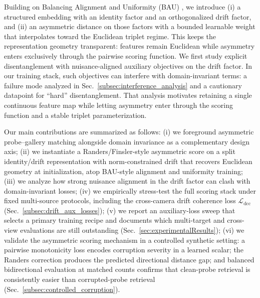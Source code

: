 Building on Balancing Alignment and Uniformity (BAU) \cite{cho2024generalizable}, we introduce (i) a structured embedding with an identity factor and an orthogonalized drift factor, and (ii) an asymmetric distance on those factors with a bounded learnable weight that interpolates toward the Euclidean triplet regime. This keeps the representation geometry transparent: features remain Euclidean while asymmetry enters exclusively through the pairwise scoring function. We first study explicit disentanglement with nuisance-aligned auxiliary objectives on the drift factor. In our training stack, such objectives can interfere with domain-invariant terms: a failure mode analyzed in Sec.~\ref{subsec:interference_analysis} and a cautionary datapoint for “hard” disentanglement. That analysis motivates retaining a single continuous feature map while letting asymmetry enter through the scoring function and a stable triplet parameterization. 


Our main contributions are summarized as follows: (i) we foreground asymmetric probe–gallery matching alongside domain invariance as a complementary design axis; (ii) we instantiate a Randers/Finsler-style asymmetric score on a split identity/drift representation with norm-constrained drift that recovers Euclidean geometry at initialization, atop BAU-style alignment and uniformity training; (iii) we analyze how strong nuisance alignment in the drift factor can clash with domain-invariant losses; (iv) we empirically stress-test the full scoring stack under fixed multi-source protocols, including the cross-camera drift coherence loss $\mathcal{L}_{\mathrm{dcc}}$ (Sec.~\ref{subsec:drift_aux_losses}); (v) we report an auxiliary-loss sweep that selects a primary training recipe and documents which multi-target and cross-view evaluations are still outstanding (Sec.~\ref{sec:experimentalResults}); (vi) we validate the asymmetric scoring mechanism in a controlled synthetic setting: a pairwise monotonicity loss encodes corruption severity in a learned scalar; the Randers correction produces the predicted directional distance gap; and balanced bidirectional evaluation at matched counts confirms that clean-probe retrieval is consistently easier than corrupted-probe retrieval (Sec.~\ref{subsec:controlled_corruption}).




